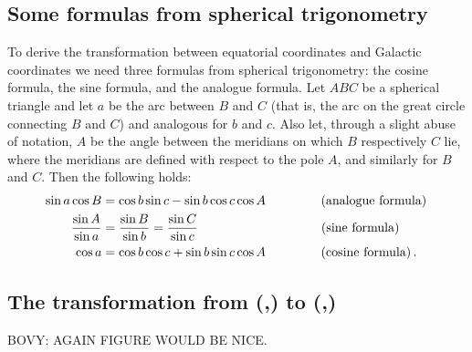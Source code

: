 \subsection{Some formulas from spherical trigonometry}

To derive the transformation between equatorial coordinates and
Galactic coordinates we need three formulas from spherical
trigonometry: the cosine formula, the sine formula, and the analogue
formula. Let $ABC$ be a spherical triangle and let $a$ be the arc
between $B$ and $C$ (that is, the arc on the great circle connecting
$B$ and $C$) and analogous for $b$ and $c$. Also let, through a slight
abuse of notation, $A$ be the angle between the meridians on which $B$
respectively $C$ lie, where the meridians are defined with respect to
the pole $A$, and similarly for $B$ and $C$. Then the following holds:
\begin{align}
\sin a \cos B & = \cos b \sin c - \sin b \cos c \cos A\, \qquad \qquad \, \textnormal{(analogue formula)}\,\label{eq:analogue}\\
\frac{\sin A}{\sin a} & = \frac{\sin B}{\sin b} = \frac{\sin C}{\sin c} \ \ \quad\qquad \qquad\qquad \qquad \textnormal{(sine formula)}\,\label{eq:sineform}\\
\cos a &= \cos b \cos c + \sin b \sin c \cos A\qquad \qquad\ \textnormal{(cosine formula)}\label{eq:cosineform}\, .
\end{align}



\subsection{The transformation from (\ra,\dec) to (\gall,\galb)}

BOVY: AGAIN FIGURE WOULD BE NICE.

